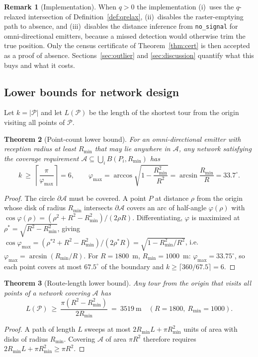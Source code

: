 \documentclass[preprint,12pt,3p]{elsarticle}
\newtheorem{theorem}{Theorem}
\theoremstyle{definition}
\newtheorem{remark}[theorem]{Remark}
\newcommand{\Rmin}{R_{\min}}
\newcommand{\bA}{\mathcal{A}}
\newcommand{\bP}{\mathcal{P}}
\begin{document}
\begin{remark}[Implementation]
When $q>0$ the implementation (i)~uses the $q$-relaxed intersection of
Definition~\ref{def:qrelax}, (ii)~disables the raster-emptying path to absence, and
(iii)~disables the distance inference from \texttt{no\_signal} for omni-directional emitters,
because a missed detection would otherwise trim the true position. Only the census certificate of
Theorem~\ref{thm:cert} is then accepted as a proof of absence. Sections~\ref{sec:outlier} and
\ref{sec:discussion} quantify what this buys and what it costs.
\end{remark}

\subsection{Lower bounds for network design}
\label{sec:bounds}

Let $k=|\bP|$ and let $L(\bP)$ be the length of the shortest tour from the origin visiting all
points of $\bP$.

\begin{theorem}[Point-count lower bound]
\label{thm:klb}
For an omni-directional emitter with reception radius at least $\Rmin$ that may lie anywhere in
$\bA$, any network satisfying the coverage requirement $\bA\subseteq\bigcup_i B(P_i,\Rmin)$ has
\begin{equation}
k\ \ge\ \left\lceil\frac{\pi}{\varphi_{\max}}\right\rceil=6,
\qquad
\varphi_{\max}=\arccos\!\sqrt{1-\frac{\Rmin^2}{R^2}}=\arcsin\!\frac{\Rmin}{R}=33.7^\circ .
\label{eq:klb}
\end{equation}
\end{theorem}
\begin{proof}
The circle $\partial\bA$ must be covered. A point $P$ at distance $\rho$ from the origin whose
disk of radius $\Rmin$ intersects $\partial\bA$ covers an arc of half-angle $\varphi(\rho)$ with
$\cos\varphi(\rho)=(\rho^2+R^2-\Rmin^2)/(2\rho R)$. Differentiating, $\varphi$ is maximized at
$\rho^\ast=\sqrt{R^2-\Rmin^2}$, giving
$\cos\varphi_{\max}=(\rho^{\ast2}+R^2-\Rmin^2)/(2\rho^\ast R)=\sqrt{1-\Rmin^2/R^2}$, i.e.
$\varphi_{\max}=\arcsin(\Rmin/R)$. For $R=1800$~m, $\Rmin=1000$~m:
$\varphi_{\max}=33.75^\circ$, so each point covers at most $67.5^\circ$ of the boundary and
$k\ge\lceil360/67.5\rceil=6$.
\end{proof}

\begin{theorem}[Route-length lower bound]
\label{thm:llen}
Any tour from the origin that visits all points of a network covering $\bA$ has
\begin{equation}
L(\bP)\ \ge\ \frac{\pi(R^2-\Rmin^2)}{2\Rmin}\ =\ 3519\ \text{m}
\quad (R=1800,\ \Rmin=1000).
\label{eq:llen}
\end{equation}
\end{theorem}
\begin{proof}
A path of length $L$ sweeps at most $2\Rmin L+\pi\Rmin^2$ units of area with disks of radius
$\Rmin$. Covering $\bA$ of area $\pi R^2$ therefore requires
$2\Rmin L+\pi\Rmin^2\ge\pi R^2$.
\end{proof}
\end{document}
